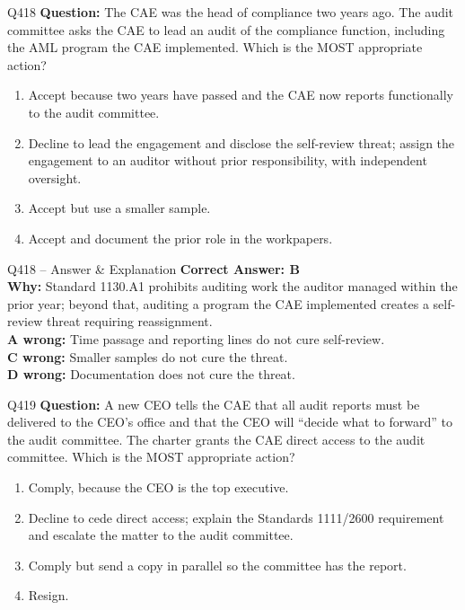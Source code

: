 \documentclass[aspectratio=169,10pt]{beamer}
\begin{document}
	\begin{frame}[t]{Q418}
		\small
		\textbf{Question:} The CAE was the head of compliance two years ago. The audit committee asks the CAE to lead an audit of the compliance function, including the AML program the CAE implemented. Which is the MOST appropriate action?
		\begin{enumerate}[label=\Alph*.,itemsep=1pt,topsep=2pt]
			\item Accept because two years have passed and the CAE now reports functionally to the audit committee.
			\item Decline to lead the engagement and disclose the self-review threat; assign the engagement to an auditor without prior responsibility, with independent oversight.
			\item Accept but use a smaller sample.
			\item Accept and document the prior role in the workpapers.
		\end{enumerate}
	\end{frame}
	
	\begin{frame}[t]{Q418 -- Answer \& Explanation}
		\small
		\textbf{Correct Answer: B} \\[4pt]
		\textbf{Why:} Standard 1130.A1 prohibits auditing work the auditor managed within the prior year; beyond that, auditing a program the CAE implemented creates a self-review threat requiring reassignment. \\[4pt]
		\textbf{A wrong:} Time passage and reporting lines do not cure self-review. \\[2pt]
		\textbf{C wrong:} Smaller samples do not cure the threat. \\[2pt]
		\textbf{D wrong:} Documentation does not cure the threat.
	\end{frame}
	
	\begin{frame}[t]{Q419}
		\small
		\textbf{Question:} A new CEO tells the CAE that all audit reports must be delivered to the CEO's office and that the CEO will ``decide what to forward'' to the audit committee. The charter grants the CAE direct access to the audit committee. Which is the MOST appropriate action?
		\begin{enumerate}[label=\Alph*.,itemsep=1pt,topsep=2pt]
			\item Comply, because the CEO is the top executive.
			\item Decline to cede direct access; explain the Standards 1111/2600 requirement and escalate the matter to the audit committee.
			\item Comply but send a copy in parallel so the committee has the report.
			\item Resign.
		\end{enumerate}
	\end{frame}
	
\end{document}
